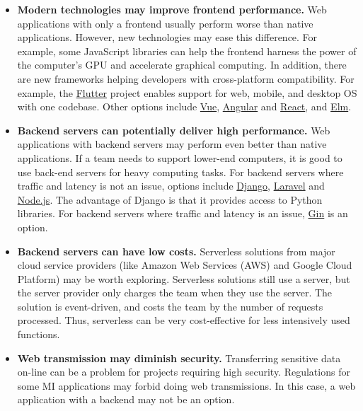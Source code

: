 \documentclass[final, 12pt, 3p, times]{elsarticle}
\begin{document}
\begin{itemize}

\item \textbf{Modern technologies may improve frontend performance.} Web
applications with only a frontend usually perform worse than native
applications. However, new technologies may ease this difference. For example,
some JavaScript libraries can help the frontend harness the power of the
computer's GPU and accelerate graphical computing. In addition, there are new
frameworks helping developers with cross-platform compatibility. For example,
the \href{https://flutter.dev/}{Flutter} project enables support for web,
mobile, and desktop OS with one codebase.  Other options include
\href{https://vuejs.org/} {Vue}, \href{https://angular.io/} {Angular} and
\href{https://reactjs.org/} {React}, and \href{https://elm-lang.org/}{Elm}.  

\item \textbf{Backend servers can potentially deliver high performance.} Web
applications with backend servers may perform even better than native
applications. If a team needs to support lower-end computers, it is good to use
back-end servers for heavy computing tasks.  For backend servers where traffic
and latency is not an issue, options include
\href{https://www.django-rest-framework.org/} {Django}, \href{https://laravel.com/} {Laravel} and
\href{https://nodejs.org/en/} {Node.js}.  The advantage of Django is that it provides access to Python
libraries.  For backend servers where traffic and latency is an issue,
\href{https://github.com/gin-gonic/gin} {Gin} is an option.

\item \textbf{Backend servers can have low costs.} Serverless solutions from
major cloud service providers (like Amazon Web Services (AWS) and Google Cloud
Platform) may be worth exploring. Serverless solutions still use a server, but
the server provider only charges the team when they use the server. The solution
is event-driven, and costs the team by the number of requests processed. Thus,
serverless can be very cost-effective for less intensively used functions.

\item \textbf{Web transmission may diminish security.} Transferring sensitive
data on-line can be a problem for projects requiring high security. Regulations
for some MI applications may forbid doing web transmissions. In this case, a web
application with a backend may not be an option.

\end{itemize}
\end{document}
